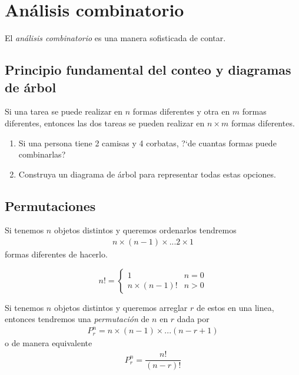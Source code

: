 \section{Análisis combinatorio}

{}
El \emph{análisis combinatorio} es una manera sofisticada de contar.


\subsection{Principio fundamental del conteo y diagramas de árbol}

Si una tarea se puede realizar en $n$ formas diferentes y otra en $m$ formas diferentes, entonces las dos tareas se pueden realizar en $n\times m$ formas diferentes.


{}
\begin{ejemplo}
	\label{exmp:1.14}
\end{ejemplo}
\begin{enumerate}
	\item Si una persona tiene 2 camisas y 4 corbatas, ?`de cuantas formas puede combinarlas?
	\item Construya un diagrama de árbol para representar todas estas opciones.
\end{enumerate}



\subsection{Permutaciones}
{}
Si tenemos $n$ objetos distintos y queremos ordenarlos tendremos
\begin{align}
	n \times (n-1) \times ... 2\times 1
\end{align} formas diferentes de hacerlo.

{}
\begin{defn}[$n$ factorial]
	\begin{equation}
		n! = \begin{cases}
			1 & n=0 \\
			n\times(n-1)! & n>0
		\end{cases}
	\end{equation}
	
\end{defn}


{}
Si tenemos $n$ objetos distintos y queremos arreglar $r$ de estos en una linea, entonces tendremos una \emph{permutación} de $n$ en $r$ dada por
\begin{align}
	\label{1.25}
	P^{n}_{r}=n\times(n-1)\times...\left( n-r+1 \right)
\end{align} 
o de manera equivalente
\begin{align}
	\label{1.27}
	P^{n}_{r}=\dfrac{n!}{(n-r)!}
\end{align}


